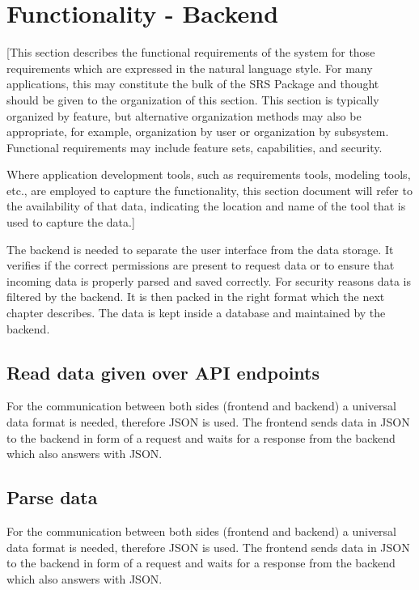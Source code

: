 \documentclass[a4paper,12pt,chapterprefix=false,bibliography=totoc,listof=totoc,]{scrreprt}
\begin{document}
\section{Functionality - Backend}
{\color{blue} [This section describes the functional requirements of the system for those requirements which are expressed in the natural language style. For many applications, this may constitute the bulk of the SRS Package and thought should be given to the organization of this section. This section is typically organized by feature, but alternative organization methods may also be appropriate, for example, organization by user or organization by subsystem.  Functional requirements may include feature sets, capabilities, and security.

Where application development tools, such as requirements tools, modeling tools, etc., are employed to capture the functionality, this section document will refer to the availability of that data, indicating the location and name of the tool that is used to capture the data.]}

{\color{magenta}
The backend is needed to separate the user interface from the data storage. It verifies if the correct permissions are present to request data or to ensure that incoming data is properly parsed and saved correctly. For security reasons data is filtered by the backend. It is then packed in the right format which the next chapter describes. The data is kept inside a database and maintained by the backend.
}


\subsection{{\color{magenta} Read data given over API endpoints}}
{\color{magenta}
For the communication between both sides (frontend and backend) a universal data format is needed, therefore JSON is used. The frontend sends data in JSON to the backend in form of a request and waits for a response from the backend which also answers with JSON.
}

\subsection{{\color{magenta} Parse data}}
{\color{magenta}
For the communication between both sides (frontend and backend) a universal data format is needed, therefore JSON is used. The frontend sends data in JSON to the backend in form of a request and waits for a response from the backend which also answers with JSON.
}
\end{document}
